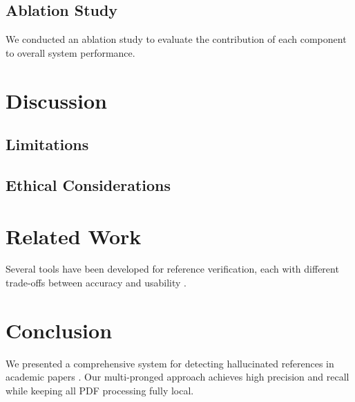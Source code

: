 \documentclass[11pt]{article}
\begin{document}
\lipsum[32-33]

\subsection{Ablation Study}

We conducted an ablation study to evaluate the contribution of each component to overall system performance.

\lipsum[45-46]

\section{Discussion}

\lipsum[34-36]

\subsection{Limitations}

\lipsum[37-38]

\subsection{Ethical Considerations}

\lipsum[47-48]

\section{Related Work}

Several tools have been developed for reference verification, each with different trade-offs between accuracy and usability \cite{devlin-etal-2019-bert,brown-etal-2020-language,raffel-etal-2020-exploring}.

\lipsum[39-40]

\lipsum[49-50]

\section{Conclusion}

We presented a comprehensive system for detecting hallucinated references in academic papers \cite{vaswani-etal-2017-attention,wolf-etal-2020-transformers}. Our multi-pronged approach achieves high precision and recall while keeping all PDF processing fully local.

\lipsum[41]



\end{document}
